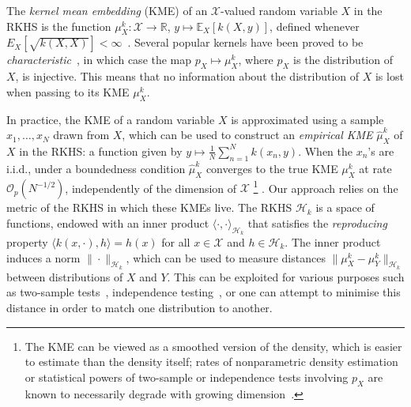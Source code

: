 \documentclass{article}
\newcommand{\calH}{\mathcal{H}}			%
\newcommand{\calO}{\mathcal{O}}			%
\newcommand{\calX}{\mathcal{X}}			%
\newcommand{\IR}{\mathbb{R}}  			%
\theoremstyle{plain}
\theoremstyle{remark}
\theoremstyle{definition}
\begin{document}
The \emph{kernel mean embedding} (KME) of an $\calX$-valued random variable $X$ in the RKHS is the function $\mu_X^k : \calX \to \IR$, $y \mapsto \mathbb{E}_X[k(X, y)]$, defined whenever $E_X[\sqrt{k(X, X)}] < \infty$~\cite{smola_hilbert_2007}. Several popular kernels have been proved to be \emph{characteristic}~\cite{FukGreSunSch08}, in which case the map $p_X \mapsto \mu_X^k$, where $p_X$ is the distribution of $X$, is injective. This means that no information about the distribution of $X$ is lost when passing to its KME $\mu_X^k$.

In practice, the KME of a random variable $X$ is approximated using a sample $x_1, \ldots, x_N$ drawn from $X$, which can be used to construct an \emph{empirical KME} $\hat{\mu}_X^k$ of $X$ in the RKHS: a function given by $y \mapsto \frac{1}{N} \sum_{n = 1}^N k(x_n, y)$.
When the $x_n$'s are i.i.d., under a boundedness condition $\hat{\mu}_X^k$ converges to the true KME $\mu^k_X$ at rate $\calO_p(N^{-1/2})$, independently of the dimension of $\calX$ \citep{LopMuaSchTol15}%
\footnote{The KME can be viewed as a smoothed version of the density, which is easier to estimate than the density itself; rates of nonparametric density estimation or statistical powers of two-sample or independence tests involving $p_X$ are known to necessarily degrade with growing dimension~\citep[Section 4.3]{tolstikhin2017minimax}.}%
.
Our approach relies on the metric of the RKHS in which these KMEs live. The RKHS $\calH_k$ is a space of functions, endowed with an inner product $\langle \cdot, \cdot \rangle_{\calH_k}$ that satisfies the \emph{reproducing} property $\langle k(x, \cdot), h \rangle = h(x)$ for all $x \in \calX$ and $h \in \calH_k$. The inner product induces a norm $\| \cdot \|_{\calH_k}$, which can be used to measure distances $\| \mu^k_X - \mu^k_Y \|_{\calH_k}$ between distributions of $X$ and $Y$. This can be exploited for various purposes such as two-sample tests~\citep{gretton_kernel_2012}, independence testing~\citep{gretton_measuring_2005}, or one can attempt to minimise this distance in order to match one distribution to another.
\end{document}
